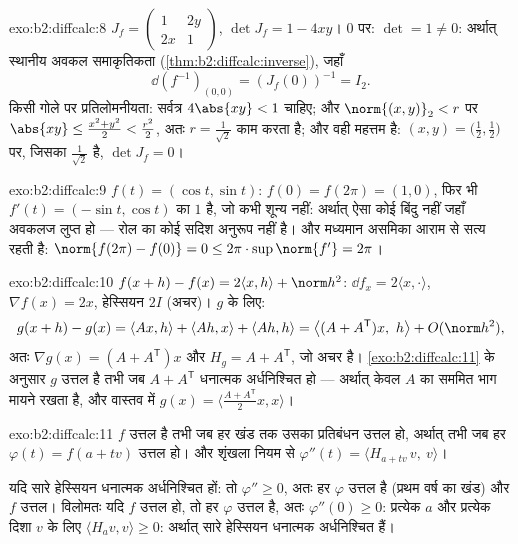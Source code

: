 \begin{solution}{exo:b2:diffcalc:8}
$J_f = \begin{pmatrix} 1 & 2y\\ 2x & 1\end{pmatrix}$, $\det J_f =
1 - 4xy$। $0$ पर: $\det = 1 \neq 0$: अर्थात् स्थानीय अवकल समाकृतिकता (\cref{thm:b2:diffcalc:inverse}), जहाँ
\[
\dd(f^{-1})_{(0,0)} = (J_f(0))^{-1} = I_2 .
\]
किसी गोले पर प्रतिलोमनीयता: सर्वत्र $4\abs{xy} < 1$ चाहिए; और $\norm{(x,y)}_2 < r$ पर $\abs{xy} \leq \frac{x^2 + y^2}{2} <
\frac{r^2}{2}$, अतः $r = \frac{1}{\sqrt2}$ काम
करता है; और वही महत्तम है: $(x, y) = \bigl(\tfrac12, \tfrac12\bigr)$ पर, जिसका  $\frac{1}{\sqrt2}$ है, $\det J_f = 0$।
\end{solution}

\begin{solution}{exo:b2:diffcalc:9}
$f(t) = (\cos t, \sin t)$: $f(0) = f(2\pi) = (1, 0)$, फिर भी $f'(t) =
(-\sin t, \cos t)$ का  $1$ है, जो कभी शून्य नहीं: अर्थात् ऐसा कोई
बिंदु नहीं जहाँ अवकलज लुप्त हो --- रोल का कोई सदिश अनुरूप नहीं है। और
मध्यमान असमिका आराम से सत्य रहती है: $\norm{f(2\pi) - f(0)} = 0 \leq
2\pi \cdot \sup\norm{f'} = 2\pi$।
\end{solution}

\begin{solution}{exo:b2:diffcalc:10}
$f(x+h) - f(x) = 2\langle x, h\rangle + \norm h^2$: $\dd f_x =
2\langle x, \cdot\rangle$, $\nabla f(x) = 2x$, हेस्सियन $2I$ (अचर)। $g$ के लिए:
\[
g(x + h) - g(x) = \langle Ax, h\rangle + \langle Ah, x\rangle
+ \langle Ah, h\rangle
= \bigl\langle (A + A^{\mathsf T})x,\ h\bigr\rangle +
O(\norm h^2),
\]
अतः $\nabla g(x) = (A + A^{\mathsf T})x$ और $H_g = A +
A^{\mathsf T}$, जो अचर है। \cref{exo:b2:diffcalc:11} के अनुसार $g$ उत्तल है तभी जब $A + A^{\mathsf T}$
धनात्मक अर्धनिश्चित हो --- अर्थात् केवल $A$ का सममित भाग मायने रखता है,
और वास्तव में $g(x) =
\langle \frac{A + A^{\mathsf T}}2 x, x\rangle$।
\end{solution}

\begin{solution}{exo:b2:diffcalc:11}
$f$ उत्तल है तभी जब हर खंड तक उसका प्रतिबंधन उत्तल हो, अर्थात् तभी जब हर
$\varphi(t) = f(a + tv)$ उत्तल हो। और शृंखला नियम से $\varphi''(t) = \langle H_{a+tv}\,v,\ v\rangle$।

यदि सारे हेस्सियन धनात्मक अर्धनिश्चित हों: तो $\varphi'' \geq 0$, अतः हर $\varphi$ उत्तल है
(प्रथम वर्ष का खंड) और $f$ उत्तल। विलोमतः यदि $f$ उत्तल हो, तो हर $\varphi$
उत्तल है, अतः $\varphi''(0) \geq 0$: प्रत्येक $a$ और प्रत्येक दिशा $v$ के लिए $\langle H_a v, v\rangle \geq 0$: अर्थात्
सारे हेस्सियन धनात्मक अर्धनिश्चित हैं।
\end{solution}

